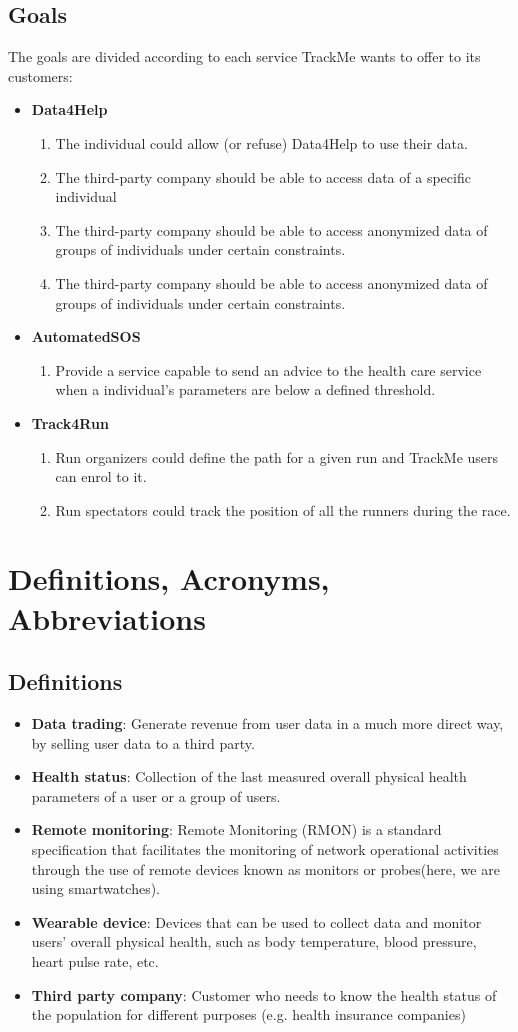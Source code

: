 \documentclass[12pt]{report}
\newcommand\goal[1]{\item[{[G#1]}] }
\begin{document}
\subsection{Goals}
The goals are divided according to each service TrackMe wants to offer to its customers:
\begin{itemize}
\item{\textbf{Data4Help}}
\begin{enumerate}
\goal{1} The individual could allow (or refuse) Data4Help to use their data.
\goal{2} The third-party company should be able to access data of a specific individual
\goal{3} The third-party company should be able to access anonymized data of groups of individuals under certain constraints.
\goal{4} The third-party company should be able to access anonymized data of groups of individuals under certain constraints.
\end{enumerate}

\item{\textbf{AutomatedSOS}}
\begin{enumerate}
\goal{5} Provide a service capable to send an advice to the health care service when a individual's parameters are below a defined threshold.
\end{enumerate}

\item{\textbf{Track4Run}}
\begin{enumerate}
\goal{6} Run organizers could define the path for a given run and TrackMe users can enrol to it.
\goal{7} Run spectators could track the position of all the runners during the race.
\end{enumerate}
\end{itemize}

\section{Definitions, Acronyms, Abbreviations}
\subsection{Definitions}
\begin{itemize}
\item{\textbf{Data trading}}: Generate revenue from user data in a much more direct way, by selling user data to a third party.
\item{\textbf{Health status}}: Collection of the last measured overall physical health parameters of a user or a group of users.
\item{\textbf{Remote monitoring}}: Remote Monitoring (RMON) is a standard specification that facilitates the monitoring of network operational activities through the use of remote devices known as monitors or probes(here, we are using smartwatches).
\item{\textbf{Wearable device}}: Devices that can be used to collect data and monitor users' overall physical health, such as body temperature, blood pressure, heart pulse rate, etc.
\item{\textbf{Third party company}}: Customer who needs to know the health status of the population for different purposes (e.g. health insurance companies)
\end{itemize}
\end{document}
